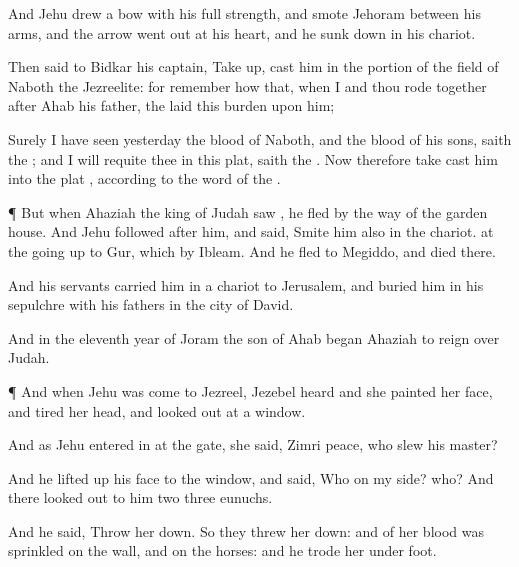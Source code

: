 {And
Jehu drew a
bow with his
full
strength, and
smote
Jehoram between his
arms, and the
arrow went
out at his
heart, and he sunk
down in his
chariot.

Then
said
{} to
Bidkar his
captain, Take
up,
{}
cast him in the
portion of the
field of
Naboth the
Jezreelite: for
remember how that, when I and thou
rode
together
after
Ahab his
father, the
{}
laid this
burden upon him;

Surely I have
seen
yesterday the
blood of
Naboth, and the
blood of his
sons,
saith the
{}; and I will
requite thee in this
plat,
saith the
{}. Now therefore
take
{}
cast him into the
plat
{}, according to the
word of the
{}.


\par }{\PP {}¶ But when
Ahaziah the
king of
Judah
saw
{}, he
fled by the
way of the
garden
house. And
Jehu
followed
after him, and
said,
Smite him also in the
chariot.
{} at the going
up to
Gur, which
{} by
Ibleam. And he
fled to
Megiddo, and
died there.

And his
servants
carried him in a chariot to
Jerusalem, and
buried him in his
sepulchre with his
fathers in the
city of
David.

And in the
eleventh
year of
Joram the
son of
Ahab began
Ahaziah to
reign over
Judah.


\par }{\PP {}¶ And when
Jehu was
come to
Jezreel,
Jezebel
heard
{} and she
painted her
face, and
tired her
head, and looked
out at a
window.

And as
Jehu entered
in at the
gate, she
said,
{}
Zimri
peace, who
slew his
master?

And he lifted
up his
face to the
window, and
said, Who
{} on my side? who? And there looked
out to him
two
{}
three
eunuchs.

And he
said, Throw her
down. So they threw her
down: and
{} of her
blood was
sprinkled on the
wall, and on the
horses: and he trode her under
foot.

}
